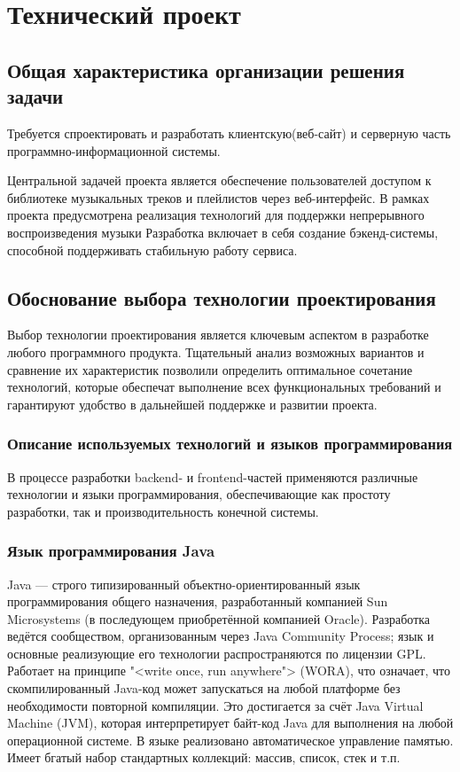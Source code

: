 \section{Технический проект}
\subsection{Общая характеристика организации решения задачи}

Требуется спроектировать и разработать клиентскую(веб-сайт) и серверную часть программно-информационной системы.

Центральной задачей проекта является обеспечение пользователей доступом к библиотеке музыкальных треков и плейлистов через веб-интерфейс. 
В рамках проекта предусмотрена реализация технологий для поддержки непрерывного воспроизведения музыки  Разработка включает в себя создание бэкенд-системы, способной поддерживать стабильную работу сервиса.

\subsection{Обоснование выбора технологии проектирования}

Выбор технологии проектирования является ключевым аспектом в разработке любого программного продукта. Тщательный анализ возможных вариантов и сравнение их характеристик позволили определить оптимальное сочетание технологий, которые обеспечат выполнение всех функциональных требований и гарантируют удобство в дальнейшей поддержке и развитии проекта. 

\subsubsection{Описание используемых технологий и языков программирования}

В процессе разработки backend- и frontend-частей применяются различные технологии и языки программирования, обеспечивающие как простоту разработки, так и производительность конечной системы.

\subsubsection{Язык программирования Java}

Java — строго типизированный объектно-ориентированный язык программирования общего назначения, разработанный компанией Sun Microsystems (в последующем приобретённой компанией Oracle). Разработка ведётся сообществом, организованным через Java Community Process; язык и основные реализующие его технологии распространяются по лицензии GPL. Работает на принципе "<write once, run anywhere"> (WORA), что означает, что скомпилированный Java-код может запускаться на любой платформе без необходимости повторной компиляции. Это достигается за счёт Java Virtual Machine (JVM), которая интерпретирует байт-код Java для выполнения на любой операционной системе\cite{java}. 
В языке реализовано автоматическое управление памятью. Имеет бгатый набор стандартных коллекций: массив, список, стек и т.п.


